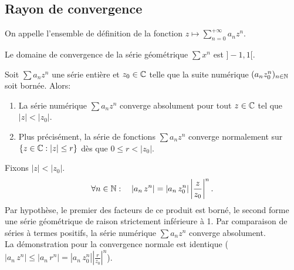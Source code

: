 \documentclass{book}
\begin{document}
\subsection{Rayon de convergence}
\begin{Definition}
On appelle  l'ensemble de définition de la fonction $z \mapsto \sum\limits_{n=0}^{+\infty} a_n z^n.$
\end{Definition}
\begin{Exemple} 
Le domaine de convergence de la série géométrique $\sum x^{n}$ est $]-1,1[$.\\
\end{Exemple}
 
\begin{Lemme}
Soit $\sum a_n z^n$ une série entière et $z_0\in \mathbb{C}$ telle que la suite numérique $(a_n z_0^n)_{n\in \mathbb{N} }$ soit bornée.
Alors:
\begin{enumerate}
\item
  La série numérique $\sum a_n z^n$ converge absolument pour tout $z\in \mathbb{C}$ tel que $|z| < |z_0|$.
\item
  Plus précisément, la série de fonctions $\sum a_n z^n$ converge normalement sur $\{z\in \mathbb{C}:|z|\leq r\}$ dès que $0 \leq r < |z_0|$.
\end{enumerate}
\end{Lemme}
\begin{Demonstration}
Fixons $|z|< |z_{0}|$.\\
$$ \forall n\in \mathbb{N}: \quad |a_{n}\,z^{n}|=\left|a_{n}\,z_{0}^{n}\right|\left|\frac {z}{z_{0}}\right|^{n}.$$
Par hypothèse, le premier des facteurs de ce produit est borné, le second forme une série géométrique de raison strictement inférieure à 1. Par comparaison de séries à termes positifs, la série numérique $\sum a_n z^n$ converge absolument.\\
La démonstration pour la convergence normale est identique ($|a_{n}\,z^{n}|\leq |a_{n}\,r^{n}|=\left|a_{n}\,z_{0}^{n}\right|\left|\frac {r}{z_{0}}\right|^{n}$). 
\end{Demonstration}
\end{document}
